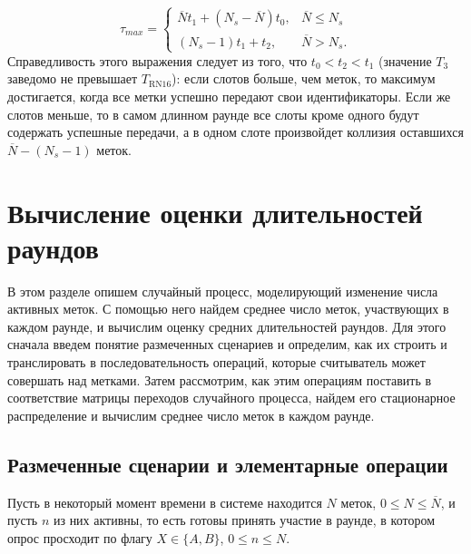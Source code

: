 \begin{equation}\label{eq:ch3_max_round_duration}
	\tau_{max} = \begin{cases}
 		\overline{N} t_1 + (N_s - \overline{N}) t_0, &\overline{N} \leqslant N_s\\
 		(N_s - 1) t_1 + t_2, &\overline{N} > N_s.
 	\end{cases}
\end{equation}
Справедливость этого выражения следует из того, что $t_0 < t_2 < t_1$ (значение $T_3$ заведомо не превышает $T_\text{RN16}$): если слотов больше, чем меток, то максимум достигается, когда все метки успешно передают свои идентификаторы. Если же слотов меньше, то в самом длинном раунде все слоты кроме одного будут содержать успешные передачи, а в одном слоте произвойдет коллизия оставшихся $\overline{N} - (N_s - 1)$ меток.



\section{Вычисление оценки длительностей раундов}\label{sec:ch3_bg}

В этом разделе опишем случайный процесс, моделирующий изменение числа активных меток. С помощью него найдем среднее число меток, участвующих в каждом раунде, и вычислим оценку средних длительностей раундов. Для этого сначала введем понятие размеченных сценариев и определим, как их строить и транслировать в последовательность операций, которые считыватель может совершать над метками. Затем рассмотрим, как этим операциям поставить в соответствие матрицы переходов случайного процесса, найдем его стационарное распределение и вычислим среднее число меток в каждом раунде.

\subsection{Размеченные сценарии и элементарные операции}
Пусть в некоторый момент времени в системе находится $N$ меток, $0 \leqslant N \leqslant \overline{N}$, и пусть $n$ из них активны, то есть готовы принять участие в раунде, в котором опрос просходит по флагу $X \in \{A, B\}$, $0 \leqslant n \leqslant N$.

